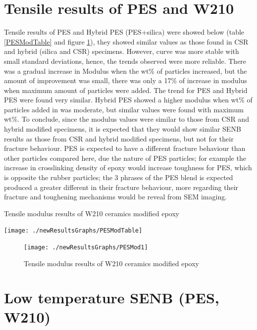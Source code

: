 \documentclass[numbers=noendperiod,chapterprefix=on]{icldt} %
\begin{document}
\section{Tensile results of PES and W210}
Tensile results of PES and Hybrid PES (PES+silica) were showed below (table \ref{PESModTable} and figure \ref{PESMod1}), they showed similar values as those found in CSR and hybrid (silica and CSR) specimens. However, curve was more stable with small standard deviations, hence, the trends observed were more reliable. There was a gradual increase in Modulus when the wt\% of particles increased, but the amount of improvement was small, there was only a 17\% of increase in modulus when maximum amount of particles were added. The trend for PES and Hybrid PES were found very similar. Hybrid PES showed a higher modulus when wt\% of particles added in was moderate, but similar values were found with maximum wt\%. To conclude, since the modulus values were similar to those from CSR and hybrid modified specimens, it is expected that they would show similar SENB results as those from CSR and hybrid modified specimens, but not for their fracture behaviour. PES is expected to have a different fracture behaviour than other particles compared here, due the nature of PES particles; for example the increase in crosslinking density of epoxy would increase toughness for PES, which is opposite the rubber particles; the 3 phrases of the PES blend is expected produced a greater different in their fracture behaviour, more regarding their fracture and toughening mechanisms would be reveal from SEM imaging.

\begin{table}[!htpb]
\centering
\caption{Tensile modulus results of W210 ceramics modified epoxy} \label{PESModTable}
\texttt{[image: ./newResultsGraphs/PESModTable]}
\end{table}
\FloatBarrier

\begin{figure}[!hp]
\centering
\texttt{[image: ./newResultsGraphs/PESMod1]}
\caption{Tensile modulus results of W210 ceramics modified epoxy}\label{PESMod1}
\end{figure}
\FloatBarrier

\section{Low temperature SENB (PES, W210)}
\end{document}
